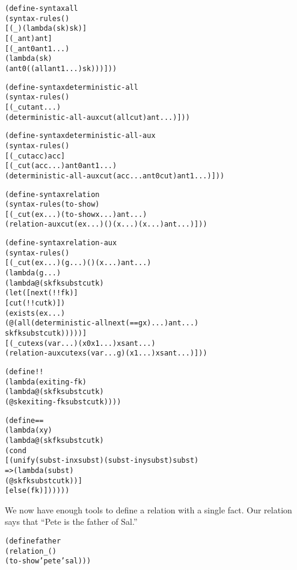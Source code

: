 \newpage
\begin{alltt}
(define-syntax all
  (syntax-rules ()
    [(_) (lambda (sk) sk)]
    [(_ ant) ant]
    [(_ ant0 ant1 ...)
     (lambda (sk)
       (ant0 ((all ant1 ...) sk)))]))

(define-syntax deterministic-all
  (syntax-rules ()
    [(_ cut ant ...)
     (deterministic-all-aux cut (all cut) ant ...)]))

(define-syntax deterministic-all-aux
  (syntax-rules ()
    [(_ cut acc) acc]
    [(_ cut (acc ...) ant0 ant1 ...)
     (deterministic-all-aux cut (acc ... ant0 cut) ant1 ...)]))

(define-syntax relation
  (syntax-rules (to-show)
    [(_ cut (ex ...) (to-show x ...) ant ...)
     (relation-aux cut (ex ...) () (x ...) (x ...) ant ...)]))

(define-syntax relation-aux
  (syntax-rules ()
    [(_ cut (ex ...) (g ...) () (x ...) ant ...)
     (lambda (g ...)
       (lambda@ (sk fk subst cutk)
         (let ([next (!! fk)]
               [cut (!! cutk)])
           (exists (ex ...)
             (@ (all (deterministic-all next (== g x) ...) ant ...)
                sk fk subst cutk)))))]
    [(_ cut exs (var ...) (x0 x1 ...) xs ant ...)
     (relation-aux cut exs (var ... g) (x1 ...) xs ant ...)]))
\end{alltt}

\begin{alltt}
(define !!
  (lambda (exiting-fk)
    (lambda@ (sk fk subst cutk)
      (@ sk exiting-fk subst cutk))))

(define ==
  (lambda (x y)
    (lambda@ (sk fk subst cutk)
      (cond
        [(unify (subst-in x subst) (subst-in y subst) subst)
         => (lambda (subst)
              (@ sk fk subst cutk))]
        [else (fk)])))))
\end{alltt}

We now have enough tools to define a relation with a single fact.
Our relation says that ``Pete is the father of Sal.''

\begin{alltt}
(define father  
  (relation _ ()
    (to-show 'pete 'sal)))
\end{alltt}

